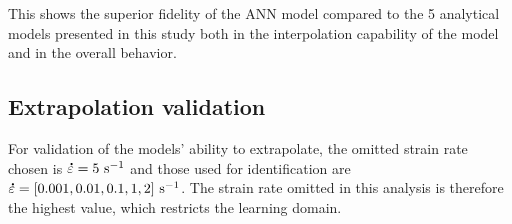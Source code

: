 \documentclass[twoside,english,1p,final,sort&compress]{elsarticle}
\theoremstyle{plain}
\DeclareRobustCommand{\mdot}[1]{\accentset{\mbox{\bfseries .}}{#1}}
\DeclareRobustCommand{\ps}{\text{s}^{-1}}
\begin{document}
This shows the superior fidelity of the ANN model compared to the 5 analytical models presented in this study both in the interpolation capability of the model and in the overall behavior.

\subsection{Extrapolation validation}

For validation of the models' ability to extrapolate, the omitted strain rate chosen is $\mdot\varepsilon=5~\ps$ and those used for identification are $\mdot\varepsilon=[0.001, 0. 01, 0. 1, 1, 2]~\ps$. The strain rate omitted in this analysis is therefore the highest value, which restricts the learning domain.
\end{document}
